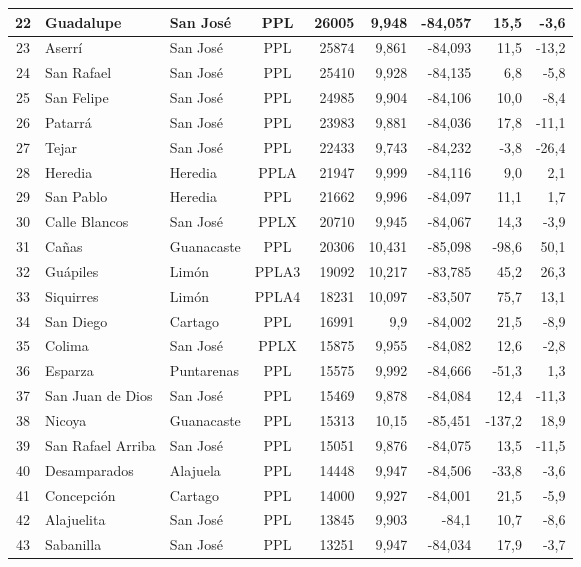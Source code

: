 \begin{longtable}{|c|l|l|c|r|r|r|r|r|}
22 & Guadalupe & San José & PPL & 26005 & 9,948 & -84,057 & 15,5 & -3,6 \\ \hline
23 & Aserrí & San José & PPL & 25874 & 9,861 & -84,093 & 11,5 & -13,2 \\ \hline
24 & San Rafael & San José & PPL & 25410 & 9,928 & -84,135 & 6,8 & -5,8 \\ \hline
25 & San Felipe & San José & PPL & 24985 & 9,904 & -84,106 & 10,0 & -8,4 \\ \hline
26 & Patarrá & San José & PPL & 23983 & 9,881 & -84,036 & 17,8 & -11,1 \\ \hline
27 & Tejar & San José & PPL & 22433 & 9,743 & -84,232 & -3,8 & -26,4 \\ \hline
28 & Heredia & Heredia & PPLA & 21947 & 9,999 & -84,116 & 9,0 & 2,1 \\ \hline
29 & San Pablo & Heredia & PPL & 21662 & 9,996 & -84,097 & 11,1 & 1,7 \\ \hline
30 & Calle Blancos & San José & PPLX & 20710 & 9,945 & -84,067 & 14,3 & -3,9 \\ \hline
31 & Cañas & Guanacaste & PPL & 20306 & 10,431 & -85,098 & -98,6 & 50,1 \\ \hline
32 & Guápiles & Limón & PPLA3 & 19092 & 10,217 & -83,785 & 45,2 & 26,3 \\ \hline
33 & Siquirres & Limón & PPLA4 & 18231 & 10,097 & -83,507 & 75,7 & 13,1 \\ \hline
34 & San Diego & Cartago & PPL & 16991 & 9,9 & -84,002 & 21,5 & -8,9 \\ \hline
35 & Colima & San José & PPLX & 15875 & 9,955 & -84,082 & 12,6 & -2,8 \\ \hline
36 & Esparza & Puntarenas & PPL & 15575 & 9,992 & -84,666 & -51,3 & 1,3 \\ \hline
37 & San Juan de Dios & San José & PPL & 15469 & 9,878 & -84,084 & 12,4 & -11,3 \\ \hline
38 & Nicoya & Guanacaste & PPL & 15313 & 10,15 & -85,451 & -137,2 & 18,9 \\ \hline
39 & San Rafael Arriba & San José & PPL & 15051 & 9,876 & -84,075 & 13,5 & -11,5 \\ \hline
40 & Desamparados & Alajuela & PPL & 14448 & 9,947 & -84,506 & -33,8 & -3,6 \\ \hline
41 & Concepción & Cartago & PPL & 14000 & 9,927 & -84,001 & 21,5 & -5,9 \\ \hline
42 & Alajuelita & San José & PPL & 13845 & 9,903 & -84,1 & 10,7 & -8,6 \\ \hline
43 & Sabanilla & San José & PPL & 13251 & 9,947 & -84,034 & 17,9 & -3,7 \\ \hline

\end{longtable}
